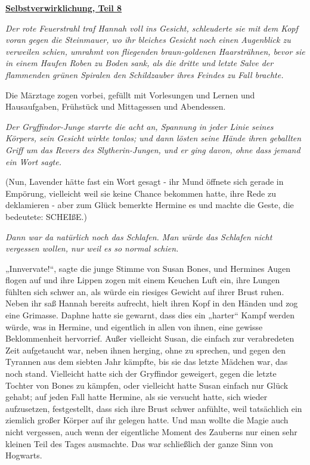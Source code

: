 

\hypertarget{selbstverwirklichung-teil-8}{%

\textbf{\uline{Selbstverwirklichung, Teil 8}}

\hfill\break \emph{Der rote Feuerstrahl traf Hannah voll ins Gesicht, schleuderte sie mit dem Kopf voran gegen die Steinmauer, wo ihr bleiches Gesicht noch einen Augenblick zu verweilen schien, umrahmt von fliegenden braun-goldenen Haarsträhnen, bevor sie in einem Haufen Roben zu Boden sank, als die dritte und letzte Salve der flammenden grünen Spiralen den Schildzauber ihres Feindes zu Fall brachte.}

Die Märztage zogen vorbei, gefüllt mit Vorlesungen und Lernen und Hausaufgaben, Frühstück und Mittagessen und Abendessen.

\emph{Der Gryffindor-Junge starrte die acht an, Spannung in jeder Linie seines Körpers, sein Gesicht wirkte tonlos; und dann lösten seine Hände ihren geballten Griff um das Revers des Slytherin-Jungen, und er ging davon, ohne dass jemand ein Wort sagte.}

(Nun, Lavender hätte fast ein Wort gesagt - ihr Mund öffnete sich gerade in Empörung, vielleicht weil sie keine Chance bekommen hatte, ihre Rede zu deklamieren - aber zum Glück bemerkte Hermine es und machte die Geste, die bedeutete: SCHEIßE.)

\emph{Dann war da natürlich noch das Schlafen. Man würde das Schlafen nicht vergessen wollen, nur weil es so normal schien.}

„Innvervate!“, sagte die junge Stimme von Susan Bones, und Hermines Augen flogen auf und ihre Lippen zogen mit einem Keuchen Luft ein, ihre Lungen fühlten sich schwer an, als würde ein riesiges Gewicht auf ihrer Brust ruhen. Neben ihr saß Hannah bereits aufrecht, hielt ihren Kopf in den Händen und zog eine Grimasse. Daphne hatte sie gewarnt, dass dies ein „harter“ Kampf werden würde, was in Hermine, und eigentlich in allen von ihnen, eine gewisse Beklommenheit hervorrief. Außer vielleicht Susan, die einfach zur verabredeten Zeit aufgetaucht war, neben ihnen herging, ohne zu sprechen, und gegen den Tyrannen aus dem siebten Jahr kämpfte, bis sie das letzte Mädchen war, das noch stand. Vielleicht hatte sich der Gryffindor geweigert, gegen die letzte Tochter von Bones zu kämpfen, oder vielleicht hatte Susan einfach nur Glück gehabt; auf jeden Fall hatte Hermine, als sie versucht hatte, sich wieder aufzusetzen, festgestellt, dass sich ihre Brust schwer anfühlte, weil tatsächlich ein ziemlich großer Körper auf ihr gelegen hatte. Und man wollte die Magie auch nicht vergessen, auch wenn der eigentliche Moment des Zauberns nur einen sehr kleinen Teil des Tages ausmachte. Das war schließlich der ganze Sinn von Hogwarts.

}
